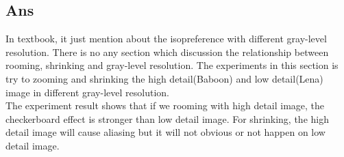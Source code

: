 \documentclass[a4paper, 11pt]{article}
\begin{document}
  \subsection*{Ans}
  In textbook, it just mention about the isopreference with different gray-level resolution. 
  There is no any section which discussion the relationship between rooming, shrinking and 
  gray-level resolution. The experiments in this section is try to zooming and shrinking 
  the high detail(Baboon) and low detail(Lena) image in different gray-level resolution.\\
  The experiment result shows that if we rooming with high detail image, the checkerboard
  effect is stronger than low detail image. For shrinking, the high detail image will cause
  aliasing but it will not obvious or not happen on low detail image.
\end{document}
